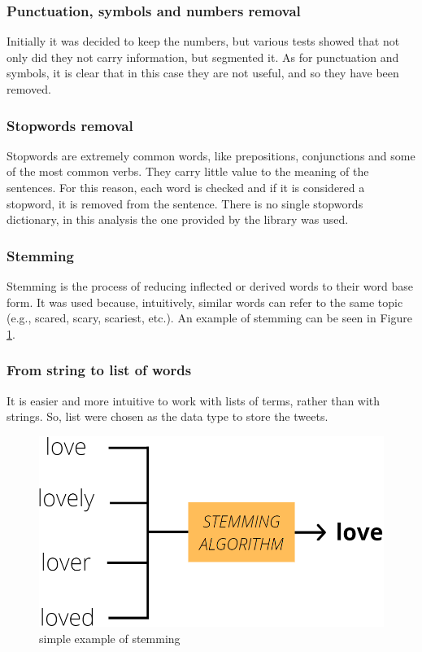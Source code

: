 \subsubsection*{Punctuation, symbols and numbers removal}
Initially it was decided to keep the numbers, but various tests showed that not only did they not carry information, but segmented it. As for punctuation and symbols, it is clear that in this case they are not useful, and so they have been removed.

\subsubsection*{Stopwords removal}
Stopwords are extremely common words, like prepositions, conjunctions and some of the most common verbs. They carry little value to the meaning of the sentences. For this reason, each word is checked and if it is considered a stopword, it is removed from the sentence. There is no single stopwords dictionary, in this analysis the one provided by the  library was used.

\subsubsection*{Stemming}
Stemming is the process of reducing inflected or derived words to their word base form. It was used because, intuitively, similar words can refer to the same topic (e.g., scared, scary, scariest, etc.). An example of stemming can be seen in Figure \ref{stem}.

\subsubsection*{From string to list of words}
It is easier and more intuitive to work with lists of terms, rather than with strings. So, list were chosen as the data type to store the tweets.

\begin{figure}[h]
  \includegraphics[scale=0.25]{stem.png}
  \centering
  \caption{simple example of stemming}
  \label{stem}
\end{figure}



